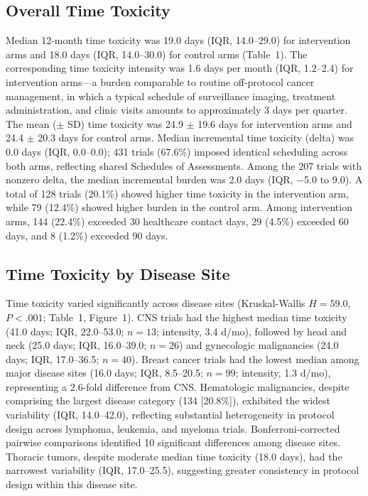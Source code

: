 \documentclass[12pt]{article}
\begin{document}
\subsection*{Overall Time Toxicity}

Median 12-month time toxicity was 19.0 days (IQR, 14.0--29.0) for intervention arms and 18.0 days (IQR, 14.0--30.0) for control arms (Table~1). The corresponding time toxicity intensity was 1.6 days per month (IQR, 1.2--2.4) for intervention arms---a burden comparable to routine off-protocol cancer management, in which a typical schedule of surveillance imaging, treatment administration, and clinic visits amounts to approximately 3 days per quarter. The mean ($\pm$ SD) time toxicity was 24.9 $\pm$ 19.6 days for intervention arms and 24.4 $\pm$ 20.3 days for control arms. Median incremental time toxicity (delta) was 0.0 days (IQR, 0.0--0.0); 431 trials (67.6\%) imposed identical scheduling across both arms, reflecting shared Schedules of Assessments. Among the 207 trials with nonzero delta, the median incremental burden was 2.0 days (IQR, $-$5.0 to 9.0). A total of 128 trials (20.1\%) showed higher time toxicity in the intervention arm, while 79 (12.4\%) showed higher burden in the control arm. Among intervention arms, 144 (22.4\%) exceeded 30 healthcare contact days, 29 (4.5\%) exceeded 60 days, and 8 (1.2\%) exceeded 90 days.

\subsection*{Time Toxicity by Disease Site}

Time toxicity varied significantly across disease sites (Kruskal-Wallis $H = 59.0$, $P < .001$; Table~1, Figure~1). CNS trials had the highest median time toxicity (41.0 days; IQR, 22.0--53.0; $n = 13$; intensity, 3.4 d/mo), followed by head and neck (25.0 days; IQR, 16.0--39.0; $n = 26$) and gynecologic malignancies (24.0 days; IQR, 17.0--36.5; $n = 40$). Breast cancer trials had the lowest median among major disease sites (16.0 days; IQR, 8.5--20.5; $n = 99$; intensity, 1.3 d/mo), representing a 2.6-fold difference from CNS. Hematologic malignancies, despite comprising the largest disease category (134 [20.8\%]), exhibited the widest variability (IQR, 14.0--42.0), reflecting substantial heterogeneity in protocol design across lymphoma, leukemia, and myeloma trials. Bonferroni-corrected pairwise comparisons identified 10 significant differences among disease sites. Thoracic tumors, despite moderate median time toxicity (18.0 days), had the narrowest variability (IQR, 17.0--25.5), suggesting greater consistency in protocol design within this disease site.
\end{document}
